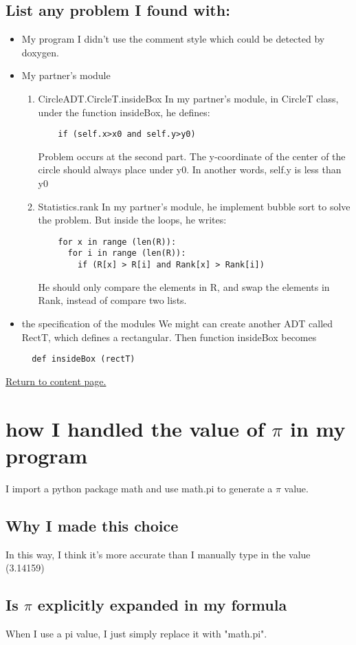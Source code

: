 \documentclass[12pt]{article}
\begin{document}
\subsection{List any problem I found with: }
\begin{itemize}
  \item My program
  \newline I didn't use the comment style which could be detected by doxygen.
  \item My partner's module
  \begin{enumerate}
    \item CircleADT.CircleT.insideBox
    \newline In my partner's module, in CircleT class, under the function insideBox, he defines:
    \begin{lstlisting}
    if (self.x>x0 and self.y>y0)
    \end{lstlisting}
    Problem occurs at the second part. The y-coordinate of the center of the circle should always place under y0. In another words, self.y is less than y0
    \item Statistics.rank
    \newline In my partner's module, he implement bubble sort to solve the problem. But inside the loops, he writes:
    \begin{lstlisting}
    for x in range (len(R)):
      for i in range (len(R)):
        if (R[x] > R[i] and Rank[x] > Rank[i])
    \end{lstlisting}
    He should only compare the elements in R, and swap the elements in Rank, instead of compare two lists.
  \end{enumerate}
  \item the specification of the modules
  \newline We might can create another ADT called RectT, which defines a rectangular. Then function insideBox becomes
  \begin{lstlisting}
  def insideBox (rectT)
  \end{lstlisting}
\end{itemize}
\newpage

\hyperlink{toc}{Return to content page.}
\section{how I handled the value of $\pi$ in my program}
I import a python package math and use math.pi to generate a $\pi$ value.
\subsection{Why I made this choice}
In this way, I think it's more accurate than I manually type in the value (3.14159)
\subsection{Is $\pi$ explicitly expanded in my formula}
When I use a pi value, I just simply replace it with "math.pi". 
\end{document}
